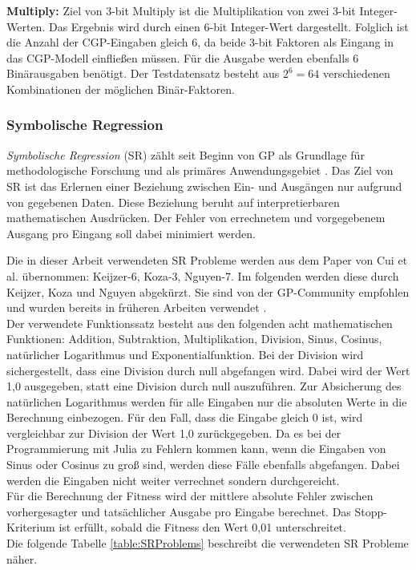 \textbf{Multiply:} Ziel von 3-bit Multiply ist die Multiplikation von zwei 3-bit Integer-Werten.
Das Ergebnis wird durch einen 6-bit Integer-Wert dargestellt. \cite{cui_weighted_mutation}
Folglich ist die Anzahl der CGP-Eingaben gleich 6, da beide 3-bit Faktoren als Eingang in das CGP-Modell einfließen müssen.
Für die Ausgabe werden ebenfalls 6 Binärausgaben benötigt.
Der Testdatensatz besteht aus $2^6=64$ verschiedenen Kombinationen der möglichen Binär-Faktoren.

\subsubsection{Symbolische Regression}
\label{subsubsec:symbolicRegression}

\emph{Symbolische Regression} (SR) zählt seit Beginn von GP als Grundlage für methodologische Forschung und als primäres Anwendungsgebiet \cite{orzechowski}.
Das Ziel von SR ist das Erlernen einer Beziehung zwischen Ein- und Ausgängen nur aufgrund von gegebenen Daten.
Diese Beziehung beruht auf interpretierbaren mathematischen Ausdrücken.
Der Fehler von errechnetem und vorgegebenem Ausgang pro Eingang soll dabei minimiert werden. \cite{makke_interpretable_2024}

Die in dieser Arbeit verwendeten SR Probleme werden aus dem Paper von Cui et al. übernommen: Keijzer-6, Koza-3, Nguyen-7.
Im folgenden werden diese durch Keijzer, Koza und Nguyen abgekürzt.
Sie sind von der GP-Community empfohlen und wurden bereits in früheren Arbeiten verwendet
\cite{white_better_2013, kalkreuth_comprehensive_2020}.\\
Der verwendete Funktionssatz besteht aus den folgenden acht mathematischen Funktionen: Addition, Subtraktion, Multiplikation, Division, Sinus, Cosinus, natürlicher Logarithmus und Exponentialfunktion.
Bei der Division wird sichergestellt, dass eine Division durch null abgefangen wird. \cite{affenzeller_positional_2024}
Dabei wird der Wert 1,0 ausgegeben, statt eine Division durch null auszuführen.
Zur Absicherung des natürlichen Logarithmus werden für alle Eingaben nur die absoluten Werte in die Berechnung einbezogen.
Für den Fall, dass die Eingabe gleich 0 ist, wird vergleichbar zur Division der Wert 1,0 zurückgegeben.
Da es bei der Programmierung mit Julia zu Fehlern kommen kann, wenn die Eingaben von Sinus oder Cosinus zu groß sind, werden diese Fälle ebenfalls abgefangen.
Dabei werden die Eingaben nicht weiter verrechnet sondern durchgereicht.\\
Für die Berechnung der Fitness wird der mittlere absolute Fehler zwischen vorhergesagter und tatsächlicher Ausgabe pro Eingabe berechnet.
Das Stopp-Kriterium ist erfüllt, sobald die Fitness den Wert 0,01 unterschreitet. \cite{affenzeller_positional_2024}\\
Die folgende Tabelle \ref{table:SRProblems} beschreibt die verwendeten SR Probleme näher.

